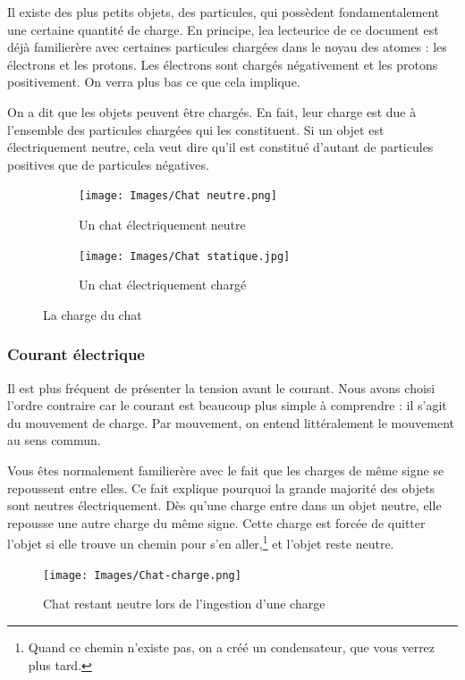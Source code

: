 \documentclass{article}
\newcommand{\inc}{\fontfamily{cmr}\selectfont\textperiodcentered}
\begin{document}
Il existe des plus petits objets, des particules, qui possèdent fondamentalement une certaine quantité de charge. En principe, le\inc a lecteur\inc ice de ce document est déjà familier\inc ère avec certaines particules chargées dans le noyau des atomes : les électrons et les protons. Les électrons sont chargés négativement et les protons positivement. On verra plus bas ce que cela implique.

On a dit que les objets peuvent être chargés. En fait, leur charge est due à l'ensemble des particules chargées qui les constituent. Si un objet est électriquement neutre, cela veut dire qu'il est constitué d'autant de particules positives que de particules négatives.

\begin{figure}[h]
\centering
\begin{subfigure}[c]{0.4\textwidth}
    \centering
    \texttt{[image: Images/Chat neutre.png]}
    \caption{Un chat électriquement neutre}
\end{subfigure}
\hspace{0.05\textwidth}
\begin{subfigure}[c]{0.4\textwidth}
    \centering
    \texttt{[image: Images/Chat statique.jpg]}  
    \caption{Un chat électriquement chargé}
\end{subfigure}
\caption{La charge du chat}
\end{figure}

\subsubsection{Courant électrique}

Il est plus fréquent de présenter la tension avant le courant. Nous avons choisi l'ordre contraire car le courant est beaucoup plus simple à comprendre : il s'agit du mouvement de charge. Par mouvement, on entend littéralement le mouvement au sens commun.

Vous êtes normalement familier\inc ère avec le fait que les charges de même signe se repoussent entre elles. Ce fait explique pourquoi la grande majorité des objets sont neutres électriquement. Dès qu'une charge entre dans un objet neutre, elle repousse une autre charge du même signe. Cette charge est forcée de quitter l'objet si elle trouve un chemin pour s'en aller,\footnote{Quand ce chemin n'existe pas, on a créé un condensateur, que vous verrez plus tard.} et l'objet reste neutre.
\begin{figure}[h]
\centering
\texttt{[image: Images/Chat-charge.png]}
\caption{Chat restant neutre lors de l'ingestion d'une charge}
\label{fig:chat-charge}
\end{figure}
\end{document}
